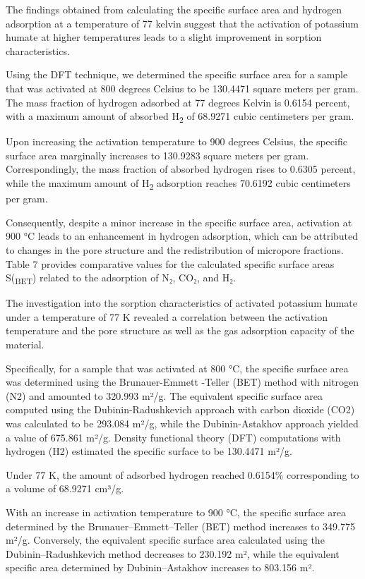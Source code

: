 \begin{multicols}{2}
The findings obtained from calculating the specific surface area and
hydrogen adsorption at a temperature of 77 kelvin suggest that the
activation of potassium humate at higher temperatures leads to a slight
improvement in sorption characteristics.

Using the DFT technique, we determined the specific surface area for a
sample that was activated at 800 degrees Celsius to be 130.4471 square
meters per gram. The mass fraction of hydrogen adsorbed at 77 degrees
Kelvin is 0.6154 percent, with a maximum amount of absorbed
H\textsubscript{2} of 68.9271 cubic centimeters per gram.

Upon increasing the activation temperature to 900 degrees Celsius, the
specific surface area marginally increases to 130.9283 square meters per
gram. Correspondingly, the mass fraction of absorbed hydrogen rises to
0.6305 percent, while the maximum amount of H\textsubscript{2}
adsorption reaches 70.6192 cubic centimeters per gram.

Consequently, despite a minor increase in the specific surface area,
activation at 900 °C leads to an enhancement in hydrogen adsorption,
which can be attributed to changes in the pore structure and the
redistribution of micropore fractions. Table 7 provides comparative
values for the calculated specific surface areas S(\textsubscript{BET})
related to the adsorption of N₂, CO₂, and H₂.

The investigation into the sorption characteristics of activated
potassium humate under a temperature of 77 K revealed a correlation
between the activation temperature and the pore structure as well as the
gas adsorption capacity of the material.

Specifically, for a sample that was activated at 800 °C, the specific
surface area was determined using the Brunauer-Emmett -Teller (BET)
method with nitrogen (N2) and amounted to 320.993 m²/g. The equivalent
specific surface area computed using the Dubinin-Radushkevich approach
with carbon dioxide (CO2) was calculated to be 293.084 m²/g, while the
Dubinin-Astakhov approach yielded a value of 675.861 m²/g. Density
functional theory (DFT) computations with hydrogen (H2) estimated the
specific surface to be 130.4471 m²/g.

Under 77 K, the amount of adsorbed hydrogen reached 0.6154\%
corresponding to a volume of 68.9271 cm³/g.

With an increase in activation temperature to 900 °C, the specific
surface area determined by the Brunauer--Emmett--Teller (BET) method
increases to 349.775 m²/g. Conversely, the equivalent specific surface
area calculated using the Dubinin--Radushkevich method decreases to
230.192 m², while the equivalent specific area determined by
Dubinin--Astakhov increases to 803.156 m².
\end{multicols}

